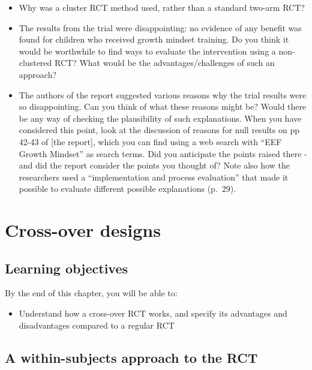 \documentclass{krantz}
\providecommand{\tightlist}{%
\setlength{\itemsep}{0pt}\setlength{\parskip}{0pt}}
\begin{document}
\begin{itemize}
\item
  Why was a cluster RCT method used, rather than a standard two-arm RCT?
\item
  The results from the trial were disappointing: no evidence of any benefit was found for children who received growth mindset training. Do you think it would be worthwhile to find ways to evaluate the intervention using a non-clustered RCT? What would be the advantages/challenges of such an approach?
\item
  The authors of the report suggested various reasons why the trial results were so disappointing. Can you think of what these reasons might be? Would there be any way of checking the plausibility of such explanations. When you have considered this point, look at the discussion of reasons for null results on pp 42-43 of {[}the report{]}, which you can find using a web search with ``EEF Growth Mindset'' as search terms. Did you anticipate the points raised there - and did the report consider the points you thought of? Note also how the researchers used a ``implementation and process evaluation'' that made it possible to evaluate different possible explanations (p.~29).
\end{itemize}

\hypertarget{crossover}{%
\chapter{Cross-over designs}\label{crossover}}

\hypertarget{learning-objectives-16}{%
\section{Learning objectives}\label{learning-objectives-16}}

By the end of this chapter, you will be able to:

\begin{itemize}
\tightlist
\item
  Understand how a cross-over RCT works, and specify its advantages and disadvantages compared to a regular RCT
\end{itemize}

\hypertarget{a-within-subjects-approach-to-the-rct}{%
\section{A within-subjects approach to the RCT}\label{a-within-subjects-approach-to-the-rct}}
\end{document}
